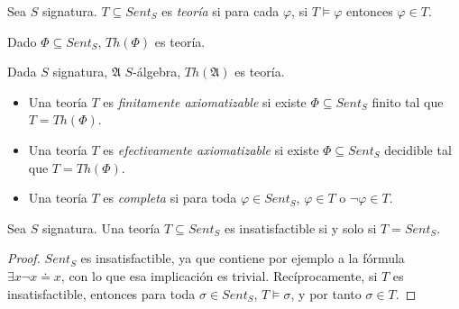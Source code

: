 \begin{definition}
Sea $S$ signatura. $T \subseteq Sent_S$ es \textit{teoría} si para cada $\varphi$, si $T \vDash \varphi$ entonces $\varphi \in T$.
\end{definition}

\begin{example}
Dado $\Phi \subseteq Sent_S$, $Th(\Phi)$ es teoría.
\end{example}
\begin{example}
Dada $S$ signatura, $\mathfrak{A}$ $S$-álgebra, $Th(\mathfrak{A})$ es teoría. 
\end{example}

\begin{defs*}\mbox{}
\begin{itemize}
    \item Una teoría $T$ es \textit{finitamente axiomatizable} si existe $\Phi \subseteq Sent_S$ finito tal que $T=Th(\Phi)$.
    \item Una teoría $T$ es \textit{efectivamente axiomatizable} si existe $\Phi \subseteq Sent_S$ decidible tal que $T=Th(\Phi)$.
    \item Una teoría $T$ es \textit{completa} si para toda $\varphi \in Sent_S$, $\varphi \in T$ o $\neg \varphi \in T$.
\end{itemize}
\end{defs*}

\begin{lema}
Sea $S$ signatura. Una teoría $T \subseteq Sent_S$ es insatisfactible si y solo si $T = Sent_S$.
\end{lema}
\begin{proof}
$Sent_S$ es insatisfactible, ya que contiene por ejemplo a la fórmula $\exists x\neg x\doteq x$, con lo que esa implicación es trivial. Recíprocamente, si $T$ es insatisfactible, entonces para toda $\sigma \in Sent_S$, $T \vDash \sigma$, y por tanto $\sigma \in T$.
\end{proof}

